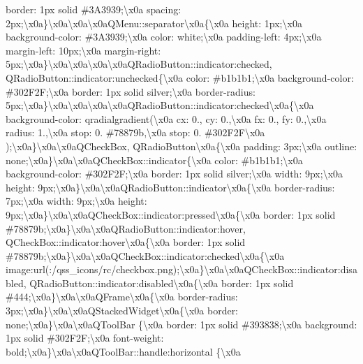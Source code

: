 border\+: 1px solid \#3\+A3939;\textbackslash{}x0a spacing\+: 2px;\textbackslash{}x0a\}\textbackslash{}x0a\textbackslash{}x0a\textbackslash{}x0a\+Q\+Menu\+::separator\textbackslash{}x0a\{\textbackslash{}x0a height\+: 1px;\textbackslash{}x0a background-\/color\+: \#3\+A3939;\textbackslash{}x0a color\+: white;\textbackslash{}x0a padding-\/left\+: 4px;\textbackslash{}x0a margin-\/left\+: 10px;\textbackslash{}x0a margin-\/right\+: 5px;\textbackslash{}x0a\}\textbackslash{}x0a\textbackslash{}x0a\textbackslash{}x0a\textbackslash{}x0a\+Q\+Radio\+Button\+::indicator\+:checked, Q\+Radio\+Button\+::indicator\+:unchecked\{\textbackslash{}x0a color\+: \#b1b1b1;\textbackslash{}x0a background-\/color\+: \#302\+F2\+F;\textbackslash{}x0a border\+: 1px solid silver;\textbackslash{}x0a border-\/radius\+: 5px;\textbackslash{}x0a\}\textbackslash{}x0a\textbackslash{}x0a\textbackslash{}x0a\textbackslash{}x0a\+Q\+Radio\+Button\+::indicator\+:checked\textbackslash{}x0a\{\textbackslash{}x0a background-\/color\+: qradialgradient(\textbackslash{}x0a cx\+: 0., cy\+: 0.,\textbackslash{}x0a fx\+: 0., fy\+: 0.,\textbackslash{}x0a radius\+: 1.,\textbackslash{}x0a stop\+: 0. \#78879b,\textbackslash{}x0a stop\+: 0. \#302\+F2\+F\textbackslash{}x0a );\textbackslash{}x0a\}\textbackslash{}x0a\textbackslash{}x0a\+Q\+Check\+Box, Q\+Radio\+Button\textbackslash{}x0a\{\textbackslash{}x0a padding\+: 3px;\textbackslash{}x0a outline\+: none;\textbackslash{}x0a\}\textbackslash{}x0a\textbackslash{}x0a\+Q\+Check\+Box\+::indicator\{\textbackslash{}x0a color\+: \#b1b1b1;\textbackslash{}x0a background-\/color\+: \#302\+F2\+F;\textbackslash{}x0a border\+: 1px solid silver;\textbackslash{}x0a width\+: 9px;\textbackslash{}x0a height\+: 9px;\textbackslash{}x0a\}\textbackslash{}x0a\textbackslash{}x0a\+Q\+Radio\+Button\+::indicator\textbackslash{}x0a\{\textbackslash{}x0a border-\/radius\+: 7px;\textbackslash{}x0a width\+: 9px;\textbackslash{}x0a height\+: 9px;\textbackslash{}x0a\}\textbackslash{}x0a\textbackslash{}x0a\+Q\+Check\+Box\+::indicator\+:pressed\textbackslash{}x0a\{\textbackslash{}x0a border\+: 1px solid \#78879b;\textbackslash{}x0a\}\textbackslash{}x0a\textbackslash{}x0a\+Q\+Radio\+Button\+::indicator\+:hover, Q\+Check\+Box\+::indicator\+:hover\textbackslash{}x0a\{\textbackslash{}x0a border\+: 1px solid \#78879b;\textbackslash{}x0a\}\textbackslash{}x0a\textbackslash{}x0a\+Q\+Check\+Box\+::indicator\+:checked\textbackslash{}x0a\{\textbackslash{}x0a image\+:url(\+:/qss\+\_\+icons/rc/checkbox.\+png);\textbackslash{}x0a\}\textbackslash{}x0a\textbackslash{}x0a\+Q\+Check\+Box\+::indicator\+:disabled, Q\+Radio\+Button\+::indicator\+:disabled\textbackslash{}x0a\{\textbackslash{}x0a border\+: 1px solid \#444;\textbackslash{}x0a\}\textbackslash{}x0a\textbackslash{}x0a\+Q\+Frame\textbackslash{}x0a\{\textbackslash{}x0a border-\/radius\+: 3px;\textbackslash{}x0a\}\textbackslash{}x0a\textbackslash{}x0a\+Q\+Stacked\+Widget\textbackslash{}x0a\{\textbackslash{}x0a border\+: none;\textbackslash{}x0a\}\textbackslash{}x0a\textbackslash{}x0a\+Q\+Tool\+Bar \{\textbackslash{}x0a border\+: 1px solid \#393838;\textbackslash{}x0a background\+: 1px solid \#302\+F2\+F;\textbackslash{}x0a font-\/weight\+: bold;\textbackslash{}x0a\}\textbackslash{}x0a\textbackslash{}x0a\+Q\+Tool\+Bar\+::handle\+:horizontal \{\textbackslash{}x0a 
